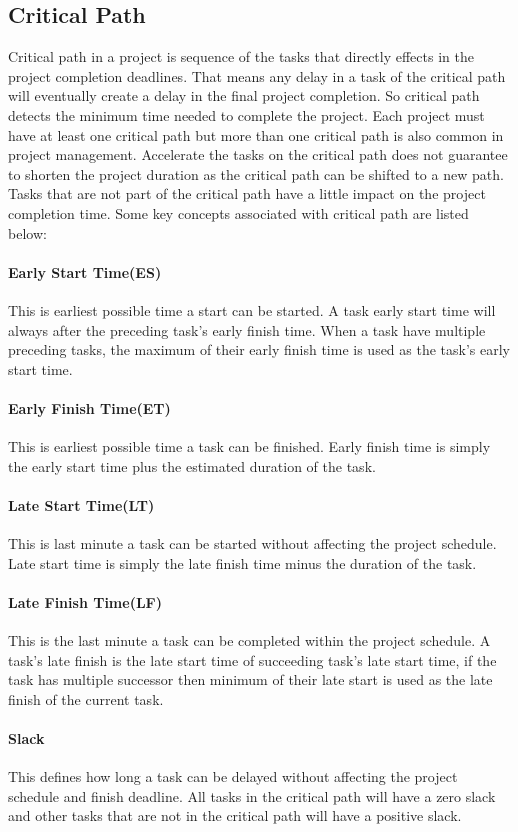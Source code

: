 \begin{spacing}{1}
\section{Critical Path}
Critical path in a project is sequence of the tasks that directly effects in the project completion deadlines. That means any delay in a task of the critical path will eventually create a delay in the final project completion. So critical path detects the minimum time needed to complete the project. Each project must have at least one critical path but more than one critical path is also common in project management. Accelerate the tasks on the critical path does not guarantee to shorten the project duration as the critical path can be shifted to a new path. Tasks that are not part of the critical path have a little impact on the project completion time. Some key concepts associated with critical path are listed below:
 
 \paragraph{Early Start Time(ES)} 
 This is earliest possible time a start can be started. A task early start time will always after the preceding task's early finish time. When a task have multiple preceding tasks, the maximum of their early finish time is used as the task's early start time.
 \paragraph{Early Finish Time(ET)}
 This is earliest possible time a task can be finished. Early finish time is simply the early start time plus the estimated duration of the task.
 \paragraph{Late Start Time(LT)}
 This is last minute a task can be started without affecting the project schedule. Late start time is simply the late finish time minus the duration of the task.
 \paragraph{Late Finish Time(LF)}
 This is the last minute a task can be completed within the project schedule. A task's late finish is the late start time of succeeding task's late start time, if the task has multiple successor then minimum of their late start is used as the late finish of the current task.  
 \paragraph{Slack}
 This defines how long a task can be delayed without affecting the project schedule and finish deadline. All tasks in the critical path will have a zero slack and other tasks that are not in the critical path will have a positive slack.
 

\end{spacing}
